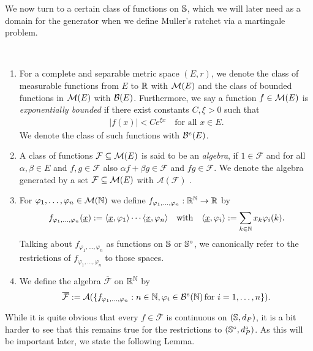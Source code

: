 \noindent
We now turn to a certain class of functions on $\mathbb{S}$, which we will later need as a
domain for the generator when we define Muller's ratchet via a martingale
problem.

\begin{Definition}{\ } \label{pre:d:F}
\begin{enumerate}
\item For a complete and separable metric space $(E,r)$, we denote the class of measurable 
functions from $E$ to $\mathbb{R}$ with $\mathcal{M}\!\left(E\right)$ and the class of bounded functions in
$\mathcal{M}\!\left(E\right)$ with $\mathcal{B}\!\left(E\right)$. Furthermore, we say a function $f \in \mathcal{M}\!\left(E\right)$ is \emph{exponentially bounded} if there
exist constants $C,\xi > 0$ such that 
\begin{align} \label{pre:eq:bm} |f(x)| < C e^{\xi x} \quad \text{for all } x \in E. \end{align}
We denote the class of such functions with $\mathcal{B}^{e}\!\left(E\right)$.
  
\item
A class of functions $\mathcal{F} \subseteq \mathcal{M}\!\left(E\right)$ is said to be an \emph{algebra}, if $1 \in
\mathcal{F}$ and for all $\alpha,\beta \in E$ and $f,g \in \mathcal{F}$ also $\alpha f + \beta g \in
\mathcal{F}$ and $fg \in \mathcal{F}$. We denote the algebra
generated by a set $\mathcal{F} \subseteq \mathcal{M}\!\left(E\right)$ with $\mathcal{A}(\mathcal{F})$ .

\item
For $\varphi_1,\ldots,\varphi_n \in \mathcal{M}\!\left(\mathbb{N}\right)$ we define  
$f_{\varphi_1,\ldots,\varphi_n}: \mathbb{R}^{\mathbb{N}} \to \mathbb{R}$ by 
\[ f_{\varphi_1,\ldots,\varphi_n}(\underline{x}) := \langle \underline{x},\varphi_1 \rangle \cdots
\langle \underline{x},\varphi_n \rangle \quad \text{with} \quad \langle \underline{x},\varphi_i \rangle
:= \sum_{k \in \mathbb{N}} x_k \varphi_i(k). \]
Talking about $f_{\varphi_1,\ldots,\varphi_n}$ as functions on $\mathbb{S}$ or $\mathbb{S}^\circ$, we
canonically refer to the restrictions of $f_{\varphi_1,\ldots,\varphi_n}$ to
those spaces.

\item
We define the algebra $\overline{\mathcal{F}}$ on $\mathbb{R}^{\mathbb{N}}$ by
\[ \overline{\mathcal{F}} := \mathcal{A}(\{
f_{\varphi_1,\ldots,\varphi_n} : n \in \mathbb{N}, \varphi_i \in \mathcal{B}^{e}\!\left(\mathbb{N}\right) \text{for } i=1,\ldots,n \} ).
\]
\end{enumerate}
\end{Definition}

\noindent
While it is quite obvious that every $f \in \overline{\mathcal{F}}$ is continuous on
$(\mathbb{S},d_P)$, it is a bit harder to see that this remains true for the restrictions to
$(\mathbb{S}^\circ,d_P^\circ)$. As this will be important later, we state the following
Lemma.

